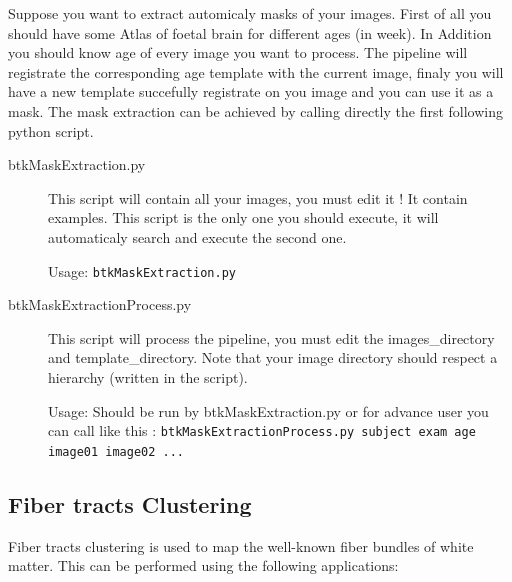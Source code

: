 Suppose you want to extract automicaly masks of your images. First of all you should have some Atlas of foetal brain for different ages (in week).
In Addition you should know age of every image you want to process.
The pipeline will registrate the corresponding age template with the current image, finaly you will have a new template succefully registrate on you image and you can use it as a mask.
The mask extraction can be achieved by calling directly the first following python script.
    \begin{description}
        \item[btkMaskExtraction.py] This script will contain all your images, you must edit it ! It contain examples. This script is the only one you should execute, it will automaticaly search and execute the second one.

        Usage: \texttt{btkMaskExtraction.py}

        \item[btkMaskExtractionProcess.py] This script will process the pipeline, you must edit the images\_directory and template\_directory. Note that your image directory should respect a hierarchy (written in the script).

        Usage: Should be run by btkMaskExtraction.py or for advance user you can call like this : \texttt{btkMaskExtractionProcess.py subject exam age image01 image02 ...}
    \end{description}

\subsection{Fiber tracts Clustering}
\label{subsec:clustering}

Fiber tracts clustering is used to map the well-known fiber bundles of white matter.
This can be performed using the following applications:

